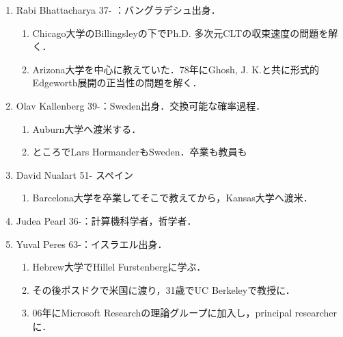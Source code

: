 \documentclass[uplatex,dvipdfmx]{jsreport}
\begin{document}
\begin{history}[米へ移った学派]
    \begin{enumerate}
        \item Rabi Bhattacharya 37- ：バングラデシュ出身．
        \begin{enumerate}
            \item Chicago大学のBillingsleyの下でPh.D. 多次元CLTの収束速度の問題を解く．
            \item Arizona大学を中心に教えていた．78年にGhosh, J. K.と共に形式的Edgeworth展開の正当性の問題を解く．
        \end{enumerate}
        \item Olav Kallenberg 39-：Sweden出身．交換可能な確率過程．
        \begin{enumerate}
            \item Auburn大学へ渡米する．
            \item ところでLars HormanderもSweden．卒業も教員も
        \end{enumerate}
        \item David Nualart 51- スペイン
        \begin{enumerate}
            \item Barcelona大学を卒業してそこで教えてから，Kansas大学へ渡米．
        \end{enumerate}
        \item Judea Pearl 36-：計算機科学者，哲学者．
        \item Yuval Peres 63-：イスラエル出身．
        \begin{enumerate}
            \item Hebrew大学でHillel Furstenbergに学ぶ．
            \item その後ポスドクで米国に渡り，31歳でUC Berkeleyで教授に．
            \item 06年にMicrosoft Researchの理論グループに加入し，principal researcherに．
        \end{enumerate}
    \end{enumerate}
\end{history}
\end{document}
